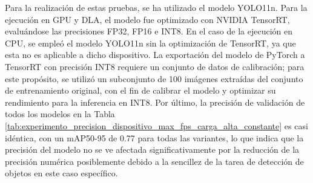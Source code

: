 \documentclass[11pt,spanish,listoffigures,listoftables]{tfgetsinf}
\begin{document}
Para la realización de estas pruebas, se ha utilizado el modelo YOLO11n. Para la ejecución en GPU y DLA, el modelo fue optimizado con NVIDIA TensorRT, evaluándose las precisiones FP32, FP16 e INT8. En el caso de la ejecución en CPU, se empleó el modelo YOLO11n sin la optimización de TensorRT, ya que esta no es aplicable a dicho dispositivo. La exportación del modelo de PyTorch a TensorRT con precisión INT8 requiere un conjunto de datos de calibración; para este propósito, se utilizó un subconjunto de 100 imágenes extraídas del conjunto de entrenamiento original, con el fin de calibrar el modelo y optimizar su rendimiento para la inferencia en INT8. Por último, la precisión de validación de todos los modelos en la Tabla \ref{tab:experimento_precision_dispositivo_max_fps_carga_alta_constante} es casi idéntica, con un mAP50-95 de 0.77 para todas las variantes, lo que indica que la precisión del modelo no se ve afectada significativamente por la reducción de la precisión numérica posiblemente debido a la sencillez de la tarea de detección de objetos en este caso específico.
\end{document}
